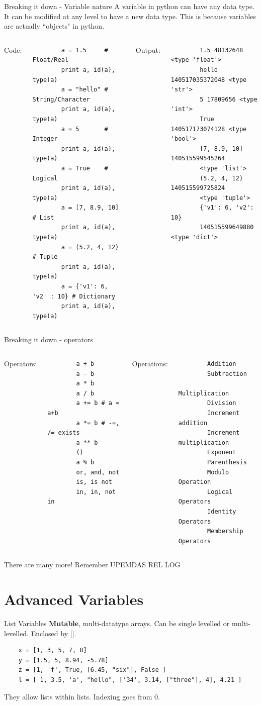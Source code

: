 \documentclass[10pt]{beamer}
\begin{document}
\begin{frame}[fragile]{Breaking it down - Variable nature}
	A variable in python can have any data type. It can be modified at any level to have a new data type. This is because variables are actually ``objects" in python.
	\begin{columns}[t]
	Code:
	\begin{lstlisting}
		a = 1.5     # Float/Real
		print a, id(a), type(a)
		a = "hello" # String/Character
		print a, id(a), type(a)
		a = 5       # Integer
		print a, id(a), type(a)
		a = True    # Logical
		print a, id(a), type(a)
		a = [7, 8.9, 10] # List
		print a, id(a), type(a)
		a = (5.2, 4, 12) # Tuple
		print a, id(a), type(a)
		a = {'v1': 6, 'v2' : 10} # Dictionary
		print a, id(a), type(a)
	\end{lstlisting}
	Output:
	\begin{lstlisting}
		1.5 48132648 <type 'float'>
		hello 140517035372048 <type 'str'>
		5 17809656 <type 'int'>
		True 140517173074128 <type 'bool'>
		[7, 8.9, 10] 140515599545264 
		<type 'list'>
		(5.2, 4, 12) 140515599725824 
		<type 'tuple'>
		{'v1': 6, 'v2': 10} 
		140515599649880 <type 'dict'>
	\end{lstlisting}
	\end{columns}
\end{frame}

\begin{frame}[fragile]{Breaking it down - operators}
	\begin{columns}[t]
	Operators:
	\begin{lstlisting}
		a + b
		a - b
		a * b
		a / b
		a += b # a = a+b
		a *= b # -=, /= exists
		a ** b
		()
		a % b
		or, and, not
		is, is not
		in, in, not in
	\end{lstlisting}
	Operations:
	\begin{lstlisting}
		Addition
		Subtraction
		Multiplication
		Division
		Increment addition
		Increment multiplication
		Exponent
		Parenthesis
		Modulo Operation
		Logical Operators
		Identity Operators
		Membership Operators
	\end{lstlisting}
	\end{columns}
	There are many more! Remember UPEMDAS REL LOG
\end{frame}
\section{Advanced Variables}
\begin{frame}[fragile]{List Variables}
\textbf{Mutable}, multi-datatype arrays. Can be single levelled or multi-levelled. Enclosed by [].

\begin{lstlisting}
	x = [1, 3, 5, 7, 8]
	y = [1.5, 5, 8.94, -5.78]
	z = [1, 'f', True, [6.45, "six"], False ]
	l = [ 1, 3.5, 'a', "hello", ['34', 3.14, ["three"], 4], 4.21 ]
\end{lstlisting}

They allow lists within lists. Indexing goes from 0.
\end{frame}
\end{document}
